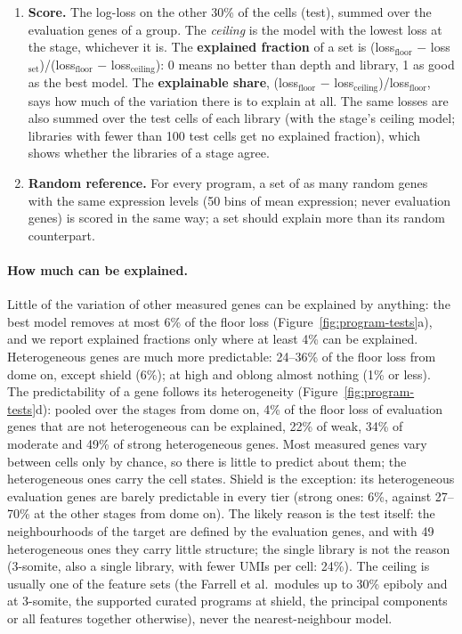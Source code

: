 \documentclass[11pt,a4paper]{article}
\begin{document}
\begin{enumerate}
	\item \textbf{Score.} The log-loss on the other 30\% of the cells (test), summed over the evaluation genes of a group. The \emph{ceiling} is the model with the lowest loss at the stage, whichever it is. The \textbf{explained fraction} of a set is (loss$_\text{floor}$ $-$ loss$_\text{set}$)/(loss$_\text{floor}$ $-$ loss$_\text{ceiling}$): 0 means no better than depth and library, 1 as good as the best model. The \textbf{explainable share}, (loss$_\text{floor}$ $-$ loss$_\text{ceiling}$)/loss$_\text{floor}$, says how much of the variation there is to explain at all. The same losses are also summed over the test cells of each library (with the stage's ceiling model; libraries with fewer than 100 test cells get no explained fraction), which shows whether the libraries of a stage agree.
	\item \textbf{Random reference.} For every program, a set of as many random genes with the same expression levels (50 bins of mean expression; never evaluation genes) is scored in the same way; a set should explain more than its random counterpart.
\end{enumerate}
\paragraph{How much can be explained.} Little of the variation of other measured genes can be explained by anything: the best model removes at most 6\% of the floor loss (Figure~\ref{fig:program-tests}a), and we report explained fractions only where at least 4\% can be explained. Heterogeneous genes are much more predictable: 24--36\% of the floor loss from dome on, except shield (6\%); at high and oblong almost nothing (1\% or less). The predictability of a gene follows its heterogeneity (Figure~\ref{fig:program-tests}d): pooled over the stages from dome on, 4\% of the floor loss of evaluation genes that are not heterogeneous can be explained, 22\% of weak, 34\% of moderate and 49\% of strong heterogeneous genes. Most measured genes vary between cells only by chance, so there is little to predict about them; the heterogeneous ones carry the cell states. Shield is the exception: its heterogeneous evaluation genes are barely predictable in every tier (strong ones: 6\%, against 27--70\% at the other stages from dome on). The likely reason is the test itself: the neighbourhoods of the target are defined by the evaluation genes, and with 49 heterogeneous ones they carry little structure; the single library is not the reason (3-somite, also a single library, with fewer UMIs per cell: 24\%). The ceiling is usually one of the feature sets (the Farrell et al.\ modules up to 30\% epiboly and at 3-somite, the supported curated programs at shield, the principal components or all features together otherwise), never the nearest-neighbour model.
\end{document}
